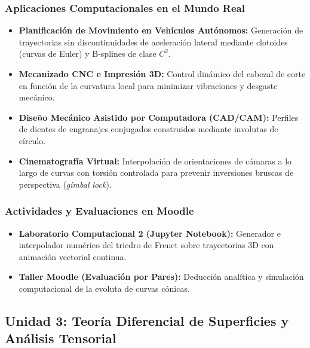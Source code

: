 \documentclass[11pt, a4paper]{article}
\begin{document}
	\subsubsection*{Aplicaciones Computacionales en el Mundo Real}
	\begin{itemize}
		\item \textbf{Planificación de Movimiento en Vehículos Autónomos:} Generación de trayectorias sin discontinuidades de aceleración lateral mediante clotoides (curvas de Euler) y B-splines de clase $C^2$.
		\item \textbf{Mecanizado CNC e Impresión 3D:} Control dinámico del cabezal de corte en función de la curvatura local para minimizar vibraciones y desgaste mecánico.
		\item \textbf{Diseño Mecánico Asistido por Computadora (CAD/CAM):} Perfiles de dientes de engranajes conjugados construidos mediante involutas de círculo.
		\item \textbf{Cinematografía Virtual:} Interpolación de orientaciones de cámaras a lo largo de curvas con torsión controlada para prevenir inversiones bruscas de perspectiva (\emph{gimbal lock}).
	\end{itemize}
	
	\subsubsection*{Actividades y Evaluaciones en Moodle}
	\begin{itemize}
		\item \textbf{Laboratorio Computacional 2 (Jupyter Notebook):} Generador e interpolador numérico del triedro de Frenet sobre trayectorias 3D con animación vectorial continua.
		\item \textbf{Taller Moodle (Evaluación por Pares):} Deducción analítica y simulación computacional de la evoluta de curvas cónicas.
	\end{itemize}
	
	\subsection{Unidad 3: Teoría Diferencial de Superficies y Análisis Tensorial}
	
\end{document}
